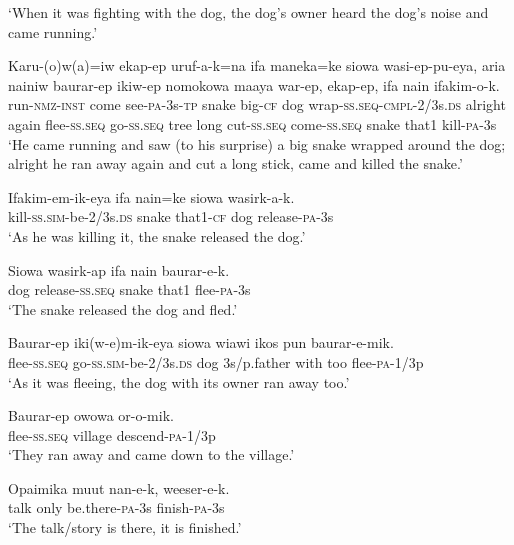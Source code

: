 \glt ‘When it was fighting with the dog, the dog’s owner heard the dog’s noise and came running.’ \\
\z


\ea
\gll  Karu-(o)w(a)=iw  ekap-ep  uruf-a-k=na  ifa  maneka=ke  siowa  wasi-ep-pu-eya,  aria  nainiw  baurar-ep  ikiw-ep  nomokowa            maaya  war-ep,  ekap-ep,  ifa  nain  ifakim-o-k. \\
run-\textsc{nmz}-\textsc{inst}  come  see-\textsc{pa}-3s-\textsc{tp}  snake  big-\textsc{cf}  dog                wrap-\textsc{ss.seq}-\textsc{cmpl}-2/3s.\textsc{ds}  alright  again  flee-\textsc{ss.seq}  go-\textsc{ss.seq}  tree long  cut-\textsc{ss.seq}  come-\textsc{ss.seq}  snake  that1  kill-\textsc{pa}-3s \\




\glt ‘He came running and saw (to his surprise) a big snake wrapped around the dog; alright he ran away again and cut a long stick, came and killed the snake.’ \\
\z


\ea
\gll  Ifakim-em-ik-eya  ifa  nain=ke  siowa  wasirk-a-k. \\
kill-\textsc{ss}.\textsc{sim}-be-2/3s.\textsc{ds}  snake  that1-\textsc{cf}  dog  release-\textsc{pa}-3s \\
\glt ‘As he was killing it, the snake released the dog.’ \\
\z


\ea
\gll  Siowa  wasirk-ap  ifa  nain  baurar-e-k. \\
dog  release-\textsc{ss.seq}  snake  that1  flee-\textsc{pa}-3s \\
\glt ‘The snake released the dog and fled.’ \\
\z


\ea
\gll  Baurar-ep  iki(w-e)m-ik-eya  siowa  wiawi  ikos  pun  baurar-e-mik. \\
flee-\textsc{ss.seq}  go-\textsc{ss}.\textsc{sim}-be-2/3s.\textsc{ds}  dog  3s/p.father  with  too  flee-\textsc{pa}-1/3p \\
\glt ‘As it was fleeing, the dog with its owner ran away too.’ \\
\z


\ea
\gll  Baurar-ep  owowa  or-o-mik. \\
flee-\textsc{ss.seq}  village  descend-\textsc{pa}-1/3p \\
\glt ‘They ran away and came down to the village.’ \\
\z


\ea
\gll  Opaimika  muut  nan-e-k,  weeser-e-k. \\
talk  only  be.there-\textsc{pa}-3s  finish-\textsc{pa}-3s \\
\glt ‘The talk/story is there, it is finished.’ \\
\z


